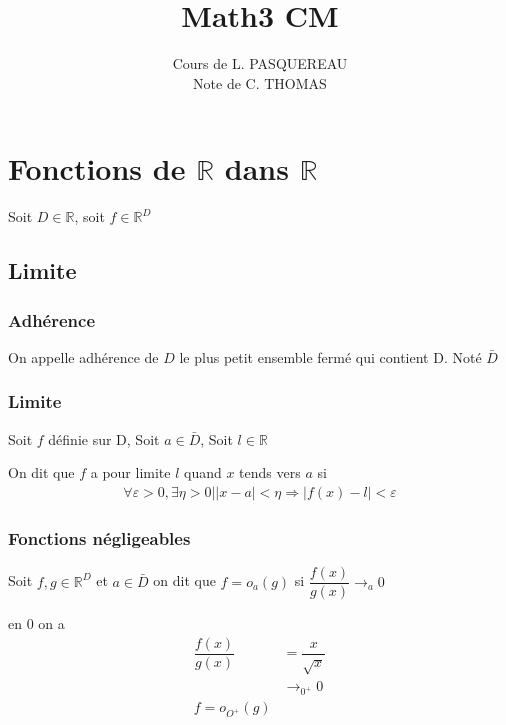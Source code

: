 \documentclass[11pt,colorlinks]{book}
\title{Math3 CM}
\author{Cours de L. PASQUEREAU \\ Note de C. THOMAS}
\theoremstyle{mytheoremstyle}
\theoremstyle{mytheoremstyle}
\theoremstyle{mytheoremstyle}
\theoremstyle{mytheoremstyle}
\theoremstyle{mytheoremstyle}
\theoremstyle{mytheoremstyle}
\theoremstyle{mytheoremstyle}
\theoremstyle{mytheoremstyle}
\theoremstyle{myproblemstyle}
\def\mbb#1{\mathbb{#1}}
\def\bR{\mbb{R}}
\begin{document}
    \maketitle
    \tableofcontents
    \pagestyle{fancy}
    \fancyfoot{}
    \chapter{Fonctions de $\bR$ dans $\bR$}

    Soit $D \in \bR$, soit $f \in \bR^{D}$ 
    \section{Limite}
    \subsection{Adhérence}
    \begin{definition}
      On appelle adhérence de $D$ le plus petit ensemble fermé qui contient D. Noté $\bar{D}$ 
    \end{definition}
    \subsection{Limite}
    Soit $f$ définie sur D, Soit $a \in \bar{D}$, Soit $l \in \bR$ 
    \begin{definition}
      On dit que $f$ a pour limite $l$ quand $x$ tends vers $a$ si
      \begin{align*}
        \forall \varepsilon > 0, \exists \eta > 0 | |x-a| < \eta \Rightarrow |f(x) - l| < \varepsilon
      \end{align*}
    \end{definition}
    \subsection{Fonctions négligeables}
    \begin{definition}
      Soit $f,g \in \bR^{D}$ et $a \in \bar{D}$ on dit que $f = o_{a}(g)$ si $\dfrac{f(x)}{g(x)} \to_{a} 0$
    \end{definition}
    \begin{ex}
      en 0 on a 
      \begin{align}
        \dfrac{f(x)}{g(x)} &= \dfrac{x}{\sqrt{x}} \\ 
                           &\to_{0^{+}} 0 \\ 
        f = o_{O^{+}}(g)
      \end{align}
    \end{ex}
\end{document}
